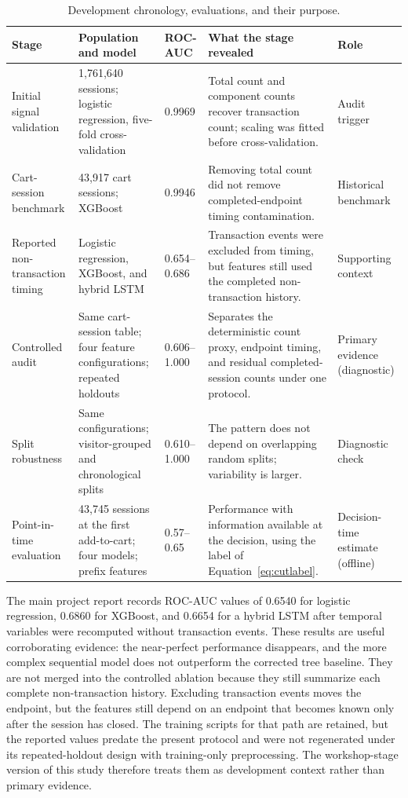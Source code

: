 \documentclass[conference, letterpaper]{IEEEtran}
\begin{document}
\begin{table}[t]
\caption{Development chronology, evaluations, and their purpose.}
\label{tab:chronology}
\centering
\small
\setlength{\tabcolsep}{4pt}
\begin{tabularx}{\textwidth}{@{}L{0.15\textwidth}L{0.20\textwidth}L{0.10\textwidth}YL{0.10\textwidth}@{}}
\toprule
Stage & Population and model & ROC-AUC & What the stage revealed & Role \\
\midrule
Initial signal validation & 1,761,640 sessions; logistic regression, five-fold cross-validation & 0.9969 & Total count and component counts recover transaction count; scaling was fitted before cross-validation. & Audit trigger \\
Cart-session benchmark & 43,917 cart sessions; XGBoost & 0.9946 & Removing total count did not remove completed-endpoint timing contamination. & Historical benchmark \\
Reported non-transaction timing & Logistic regression, XGBoost, and hybrid LSTM & 0.654--0.686 & Transaction events were excluded from timing, but features still used the completed non-transaction history. & Supporting context \\
Controlled audit & Same cart-session table; four feature configurations; repeated holdouts & 0.606--1.000 & Separates the deterministic count proxy, endpoint timing, and residual completed-session counts under one protocol. & Primary evidence (diagnostic) \\
Split robustness & Same configurations; visitor-grouped and chronological splits & 0.610--1.000 & The pattern does not depend on overlapping random splits; variability is larger. & Diagnostic check \\
Point-in-time evaluation & 43,745 sessions at the first add-to-cart; four models; prefix features & 0.57--0.65 & Performance with information available at the decision, using the label of Equation~\ref{eq:cutlabel}. & Decision-time estimate (offline) \\
\bottomrule
\end{tabularx}
\end{table}

The main project report records ROC-AUC values of 0.6540 for logistic regression, 0.6860 for XGBoost, and 0.6654 for a hybrid LSTM after temporal variables were recomputed without transaction events. These results are useful corroborating evidence: the near-perfect performance disappears, and the more complex sequential model does not outperform the corrected tree baseline. They are not merged into the controlled ablation because they still summarize each complete non-transaction history. Excluding transaction events moves the endpoint, but the features still depend on an endpoint that becomes known only after the session has closed. The training scripts for that path are retained, but the reported values predate the present protocol and were not regenerated under its repeated-holdout design with training-only preprocessing. The workshop-stage version of this study therefore treats them as development context rather than primary evidence.
\end{document}
